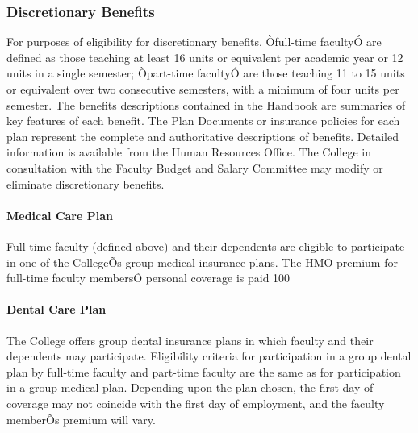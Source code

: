 \documentclass[letterpaper, 11pt]{article}
\begin{document}
		\subsubsection{Discretionary Benefits}
			For purposes of eligibility for discretionary benefits, Òfull-time facultyÓ are defined as those teaching at least 16 units or equivalent per academic year or 12 units in a single semester; Òpart-time facultyÓ are those teaching 11 to 15 units or equivalent over two consecutive semesters, with a minimum of four units per semester.  The benefits descriptions contained in the Handbook are summaries of key features of each benefit.  The Plan Documents or insurance policies for each plan represent the complete and authoritative descriptions of benefits.  Detailed information is available from the Human Resources Office.  The College in consultation with the Faculty Budget and Salary Committee may modify or eliminate discretionary benefits.
			\paragraph{Medical Care Plan}
				Full-time faculty (defined above) and their dependents are eligible to participate in one of the CollegeÕs group medical insurance plans.  The HMO premium for full-time faculty membersÕ personal coverage is paid 100%
			\paragraph{Dental Care Plan}
				The College offers group dental insurance plans in which faculty and their dependents may participate.  Eligibility criteria for participation in a group dental plan by full-time faculty and part-time faculty are the same as for participation in a group medical plan.  Depending upon the plan chosen, the first day of coverage may not coincide with the first day of employment, and the faculty memberÕs premium will vary.
\end{document}
